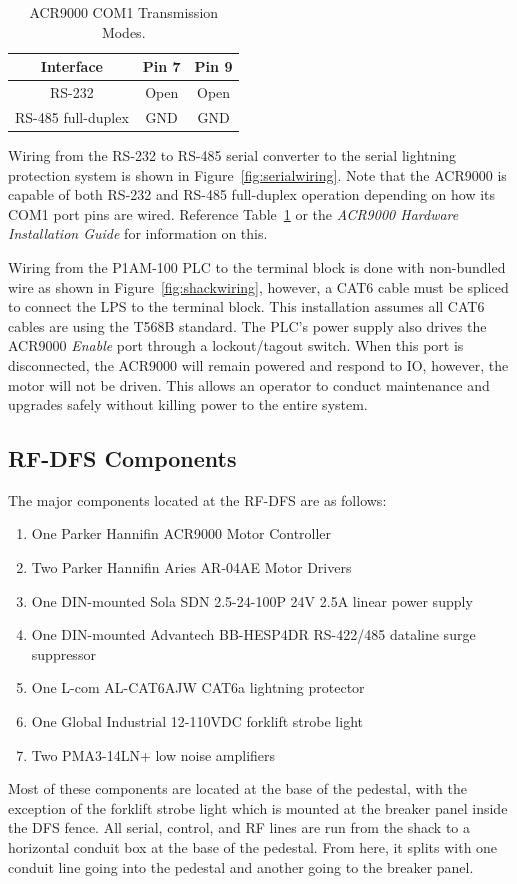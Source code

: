 \documentclass[titlepage]{article}
\begin{document}
\begin{table}[!htb]
  \begin{center}
    \begin{tabular}{c|c|c}
      Interface          & Pin 7 & Pin 9 \\ \hline
      RS-232             & Open  & Open  \\
      RS-485 full-duplex & GND   & GND   \\
    \end{tabular}
  \end{center}
  \caption{ACR9000 COM1 Transmission Modes.}\label{tab:acr9000com1}
\end{table}

Wiring from the RS-232 to RS-485 serial converter to the serial lightning protection system is shown in Figure~\ref{fig:serialwiring}. Note that the ACR9000 is capable of both RS-232 and RS-485 full-duplex operation depending on how its COM1 port pins are wired. Reference Table~\ref{tab:acr9000com1} or the \textit{ACR9000 Hardware Installation Guide} for information on this.

Wiring from the P1AM-100 PLC to the terminal block is done with non-bundled wire as shown in Figure~\ref{fig:shackwiring}, however, a CAT6 cable must be spliced to connect the LPS to the terminal block. This installation assumes all CAT6 cables are using the T568B standard. The PLC's power supply also drives the ACR9000 \textit{Enable} port through a lockout/tagout switch. When this port is disconnected, the ACR9000 will remain powered and respond to IO, however, the motor will not be driven. This allows an operator to conduct maintenance and upgrades safely without killing power to the entire system. 

\subsection{RF-DFS Components}\label{sec:higdfs}
The major components located at the RF-DFS are as follows:
\begin{enumerate}
  \item One Parker Hannifin ACR9000 Motor Controller
  \item Two Parker Hannifin Aries AR-04AE Motor Drivers
  \item One DIN-mounted Sola SDN 2.5-24-100P 24V 2.5A linear power supply
  \item One DIN-mounted Advantech BB-HESP4DR RS-422/485 dataline surge suppressor
  \item One L-com AL-CAT6AJW CAT6a lightning protector
  \item One Global Industrial 12-110VDC forklift strobe light
  \item Two PMA3-14LN+ low noise amplifiers
\end{enumerate}
Most of these components are located at the base of the pedestal, with the exception of the forklift strobe light which is mounted at the breaker panel inside the DFS fence. All serial, control, and RF lines are run from the shack to a horizontal conduit box at the base of the pedestal. From here, it splits with one conduit line going into the pedestal and another going to the breaker panel.
\end{document}
